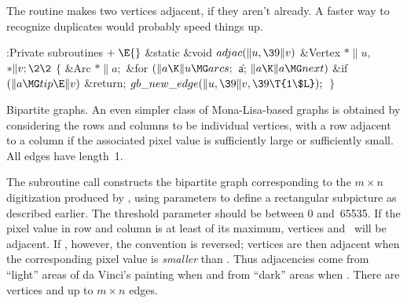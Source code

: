 The  routine makes two vertices adjacent, if they aren't
already.
A faster way to recognize duplicates would probably speed things up.

\Y\B\4:Private subroutines\X${}\mathrel+\E{}$\6
\1\1\&{static} \&{void} ${}\\{adjac}(\|u,\39\|v){}$\6
\&{Vertex} ${}{*}\|u,{}$ ${}{*}\|v;\2\2{}$\6
${}\{{}$\5
\1\&{Arc} ${}{*}\|a;{}$\7
\&{for} ${}(\|a\K\|u\MG\\{arcs};{}$ \|a; ${}\|a\K\|a\MG\\{next}){}$\1\6
\&{if} ${}(\|a\MG\\{tip}\E\|v){}$\1\5
\&{return};\2\2\6
${}\\{gb\_new\_edge}(\|u,\39\|v,\39\T{1\$L});{}$\6
\4${}\}{}$\2\par
\fi

Bipartite graphs. An even simpler class of Mona-Lisa-based graphs
is obtained by considering the  rows and  columns to be
individual
vertices, with a row adjacent to a column if the associated pixel value
is sufficiently large or sufficiently small. All edges have length~1.

The subroutine call  constructs
the bipartite graph corresponding to the $m\times n$
digitization produced by , using parameters  to
define a rectangular subpicture as described earlier.
The threshold parameter  should be between 0 and~65535.
If the pixel value in row  and column  is at least  of
its maximum, vertices  and~ will be adjacent.
If , however, the convention is reversed; vertices are then
adjacent when the corresponding pixel value is {\sl smaller\/} than
. Thus adjacencies come from ``light'' areas of
da Vinci's painting when  and from ``dark'' areas when . There
are  vertices and up to $m\times n$ edges.

